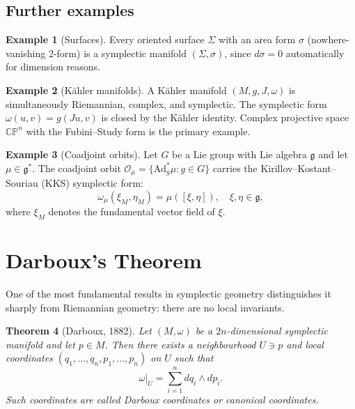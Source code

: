 \documentclass[12pt,a4paper]{amsart}
\newtheorem{theorem}{Theorem}[section]
\theoremstyle{definition}
\newtheorem{example}[theorem]{Example}
\begin{document}
\subsection{Further examples}

\begin{example}[Surfaces]
Every oriented surface $\Sigma$ with an area form $\sigma$ (nowhere-vanishing
2-form) is a symplectic manifold $(\Sigma, \sigma)$, since $d\sigma = 0$
automatically for dimension reasons.
\end{example}

\begin{example}[K\"{a}hler manifolds]
A K\"{a}hler manifold $(M, g, J, \omega)$ is simultaneously Riemannian,
complex, and symplectic.  The symplectic form $\omega(u,v) = g(Ju, v)$ is
closed by the K\"{a}hler identity.  Complex projective space $\mathbb{CP}^n$
with the Fubini--Study form is the primary example.
\end{example}

\begin{example}[Coadjoint orbits]
Let $G$ be a Lie group with Lie algebra $\mathfrak{g}$ and let
$\mu \in \mathfrak{g}^*$.  The coadjoint orbit
$\mathcal{O}_\mu = \{\mathrm{Ad}^*_g \mu : g \in G\}$ carries the
Kirillov--Kostant--Souriau (KKS) symplectic form:
\[
  \omega_\mu(\xi_M, \eta_M) = \mu([\xi, \eta]), \quad \xi, \eta \in \mathfrak{g},
\]
where $\xi_M$ denotes the fundamental vector field of $\xi$.
\end{example}

\section{Darboux's Theorem}
\label{sec:darboux}

One of the most fundamental results in symplectic geometry distinguishes it
sharply from Riemannian geometry: there are no local invariants.

\begin{theorem}[Darboux, 1882]\label{thm:darboux}
Let $(M, \omega)$ be a $2n$-dimensional symplectic manifold and let
$p \in M$.  Then there exists a neighbourhood $U \ni p$ and local coordinates
$(q_1, \ldots, q_n, p_1, \ldots, p_n)$ on $U$ such that
\[
  \omega\big|_U = \sum_{i=1}^{n} dq_i \wedge dp_i.
\]
Such coordinates are called \emph{Darboux coordinates} or \emph{canonical
coordinates}.
\end{theorem}
\end{document}
